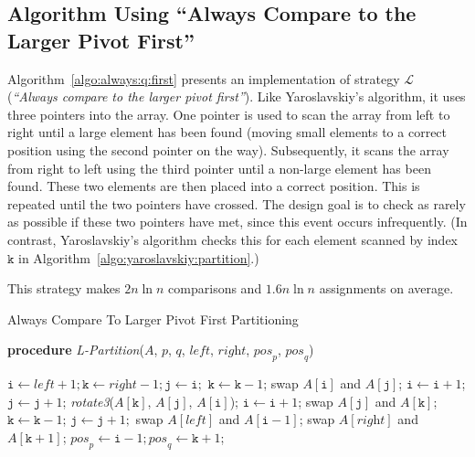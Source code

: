 \documentclass[prodmode,acmtalg]{acmsmall}
\begin{document}
\subsection{Algorithm Using ``Always Compare to the Larger Pivot First''}
\label{app:sec:algo:larger:first}
Algorithm~\ref{algo:always:q:first} presents an implementation of strategy $\mathcal{L}$ (\emph{``Always compare
to the larger pivot first''}). Like Yaroslavskiy's algorithm, it uses three pointers into the array.
One pointer is used to scan the array from left to right until a large element has been
found (moving small elements to a correct position using the second pointer on the way). Subsequently,
it scans the array from right to left using the third pointer until 
a non-large element has been found. These two elements
are then placed into a correct position. This is repeated until the two pointers have crossed. The design goal
is to check as rarely as possible if these two pointers have met, since this event occurs infrequently. (In contrast,
Yaroslavskiy's algorithm checks this for each element scanned by index $\mathtt{k}$ in Algorithm~\ref{algo:yaroslavskiy:partition}.)

This strategy makes $2n \ln n$ comparisons and $1.6 n \ln n$ assignments on average.

\begin{algorithm}
    \caption{Always Compare To Larger Pivot First Partitioning}\samepage\label{algo:always:q:first}
    \textbf{procedure} \textit{L-Partition}($\textit{A}$,
		$\textit{p}$, $\textit{q}$, $\textit{left}$,
		$\textit{right}$, $\textit{pos}_{\textit{p}}$, $\textit{pos}_{\textit{q}}$)
    \begin{algorithmic}[1]
        \State $\texttt{i} \gets \textit{left} + 1; \texttt{k} \gets \textit{right} - 1; \texttt{j} \gets \texttt{i};$
                \State $\texttt{k} \gets \texttt{k} - 1$;
            \EndWhile
                    \State swap $\textit{A}[\texttt{i}]$ and $\textit{A}[\texttt{j}]$;
                    \State $\texttt{i} \gets \texttt{i} + 1$;
                \EndIf
                \State $\texttt{j}\gets \texttt{j} + 1$;
            \EndWhile
                \State \textit{rotate3}($\textit{A}[\texttt{k}]$, $\textit{A}[\texttt{j}]$, 
                $\textit{A}[\texttt{i}]$);
                    \State $\texttt{i}\gets \texttt{i} + 1$;
                \Else
                    \State swap $\textit{A}[\texttt{j}]$ and $\textit{A}[\texttt{k}]$;
                \EndIf
                \State $\texttt{k}\gets \texttt{k} - 1$;
            \EndIf
        \State $\texttt{j}\gets \texttt{j} + 1;$
        \EndWhile
        \State swap $\textit{A}[\textit{left}]$ and $\textit{A}[\texttt{i}-1]$;
        \State swap $\textit{A}[\textit{right}]$ and $\textit{A}[\texttt{k}+1]$;
        \State $\textit{pos}_{\textit{p}} \gets \texttt{i} - 1;  \textit{pos}_{\textit{q}} \gets \texttt{k} + 1$;
    \end{algorithmic}
\end{algorithm}
\end{document}
